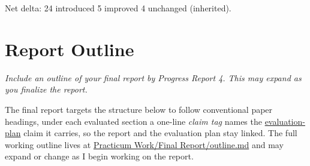 \documentclass[12pt]{article}
\newcommand{\PRNumber}{4}
\newcommand{\RepoURL}{https://github.com/Ian-Costa18/Cybersecurity-Practicum/blob/progress-report-\PRNumber}
\newcommand{\instruction}[1]{{\small\itshape #1}}
\begin{document}
Net delta: 24 introduced \textperiodcentered{} 5 improved \textperiodcentered{} 4 unchanged (inherited).

\section*{Report Outline}

\instruction{Include an outline of your final report by Progress Report 4. This may expand as you finalize the report.}

The final report targets the structure below to follow conventional paper headings, under each evaluated section a one-line \emph{claim tag} names the \href{\RepoURL/docs/evaluation-plan.md}{evaluation-plan} claim it carries, so the report and the evaluation plan stay linked. The full working outline lives at \href{\RepoURL/Practicum\%20Work/Final\%20Report/outline.md}{Practicum Work/Final Report/outline.md} and may expand or change as I begin working on the report.
\end{document}
